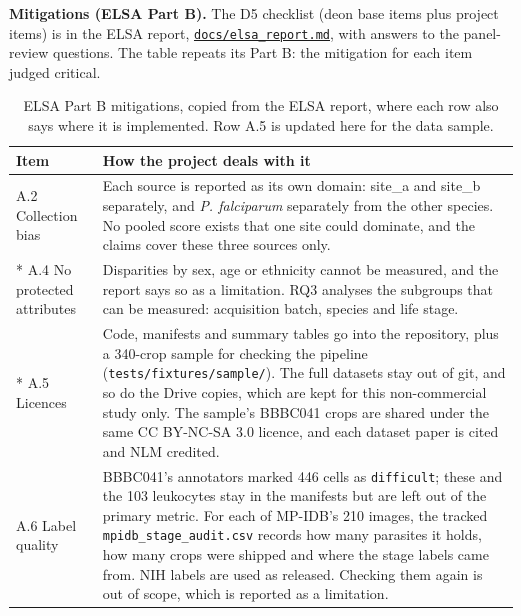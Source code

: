 \documentclass[11pt,a4paper]{article}
\begin{document}
\textbf{Mitigations (ELSA Part B).} The D5 checklist (deon base items plus project items) is in the ELSA report, \href{https://gitlab.uvt.nl/capstone/2026-fall/u927271/-/blob/v1.0-final/docs/elsa_report.md}{\texttt{docs/\allowbreak{}elsa\_\allowbreak{}report.\allowbreak{}md}}, with answers to the panel-review questions. The table repeats its Part B: the mitigation for each item judged critical.

{\small
\begin{longtable}{@{}>{\raggedright\arraybackslash\hspace{0pt}}p{79.7pt}>{\raggedright\arraybackslash\hspace{0pt}}p{256.3pt}@{}}
\toprule
Item & How the project deals with it \\
\midrule
\endhead
\bottomrule
\endfoot
\bottomrule
\caption{ELSA Part B mitigations, copied from the ELSA report, where each row also says where it is implemented. Row A.5 is updated here for the data sample.}
\endlastfoot
A.2 Collection bias & Each source is reported as its own domain: site\_\allowbreak{}a and site\_\allowbreak{}b separately, and \emph{P. falciparum} separately from the other species. No pooled score exists that one site could dominate, and the claims cover these three sources only. \\*
A.4 No protected attributes & Disparities by sex, age or ethnicity cannot be measured, and the report says so as a limitation. RQ3 analyses the subgroups that can be measured: acquisition batch, species and life stage. \\*
A.5 Licences & Code, manifests and summary tables go into the repository, plus a 340-crop sample for checking the pipeline (\texttt{tests/\allowbreak{}fixtures/\allowbreak{}sample/\allowbreak{}}). The full datasets stay out of git, and so do the Drive copies, which are kept for this non-commercial study only. The sample's BBBC041 crops are shared under the same CC BY-NC-SA 3.0 licence, and each dataset paper is cited and NLM credited. \\
A.6 Label quality & BBBC041's annotators marked 446 cells as \texttt{difficult}; these and the 103 leukocytes stay in the manifests but are left out of the primary metric. For each of MP-IDB's 210 images, the tracked \texttt{mpidb\_\allowbreak{}stage\_\allowbreak{}audit.\allowbreak{}csv} records how many parasites it holds, how many crops were shipped and where the stage labels came from. NIH labels are used as released. Checking them again is out of scope, which is reported as a limitation. \\

\end{longtable}}
\end{document}
